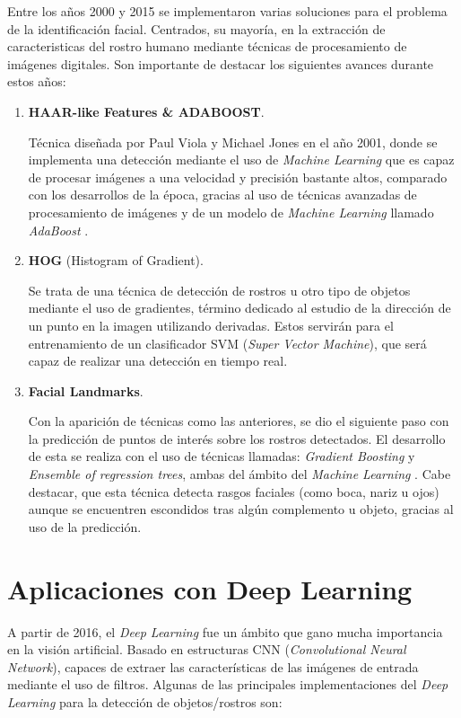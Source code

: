 Entre los años 2000 y 2015 se implementaron varias soluciones para el problema de la identificación facial. Centrados, su mayoría, en la extracción de caracteristicas del rostro humano mediante técnicas de procesamiento de imágenes digitales. Son importante de destacar los siguientes avances durante estos años:

\begin{enumerate}
	\item \textbf{HAAR-like Features \& ADABOOST}.
	
	Técnica diseñada por Paul Viola y Michael Jones en el año 2001, donde se implementa una detección mediante el uso de \textit{Machine Learning} que es capaz de procesar imágenes a una velocidad y precisión bastante altos, comparado con los desarrollos de la época, gracias al uso de técnicas avanzadas de procesamiento de imágenes y de un modelo de \textit{Machine Learning} llamado \textit{AdaBoost} \cite{paulViola}. 
	
	\item \textbf{HOG} (Histogram of Gradient).
	
	Se trata de una técnica de detección de rostros u otro tipo de objetos mediante el uso de gradientes, término dedicado al estudio de la dirección de un punto en la imagen utilizando derivadas. Estos servirán para el entrenamiento de un clasificador SVM (\textit{Super Vector Machine}), que será capaz de realizar una detección en tiempo real.
	
	\item \textbf{Facial Landmarks}.
	
	Con la aparición de técnicas como las anteriores, se dio el siguiente paso con la predicción de puntos de interés sobre los rostros detectados. El desarrollo de esta se realiza con el uso de técnicas llamadas: \textit{Gradient Boosting} y \textit{Ensemble of regression trees}, ambas del ámbito del \textit{Machine Learning} \cite{faceLandmark}. Cabe destacar, que esta técnica detecta rasgos faciales (como boca, nariz u ojos) aunque se encuentren escondidos tras algún complemento u objeto, gracias al uso de la predicción.
\end{enumerate}


\section{Aplicaciones con Deep Learning}

A partir de 2016, el \textit{Deep Learning} fue un ámbito que gano mucha importancia en la visión artificial. Basado en estructuras CNN (\textit{Convolutional Neural Network}), capaces de extraer las características de las imágenes de entrada mediante el uso de filtros. Algunas de las principales implementaciones del \textit{Deep Learning} para la detección de objetos/rostros son:


